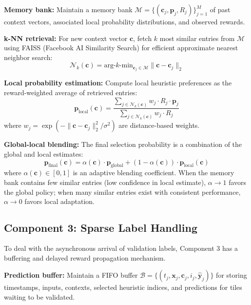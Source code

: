 \documentclass[12pt,oneside]{book}
\begin{document}
\textbf{Memory bank:} Maintain a memory bank $\mathcal{M} = \{(\mathbf{c}_j, \mathbf{p}_j, R_j)\}_{j=1}^{M}$ of past context vectors, associated local probability distributions, and observed rewards.

\textbf{k-NN retrieval:} For new context vector $\mathbf{c}$, fetch $k$ most similar entries from $\mathcal{M}$ using FAISS (Facebook AI Similarity Search) for efficient approximate nearest neighbor search:
\begin{equation}
    \mathcal{N}_k(\mathbf{c}) = \text{arg-}k\text{-min}_{\mathbf{c}_j \in \mathcal{M}} \|\mathbf{c} - \mathbf{c}_j\|_2
\end{equation}

\textbf{Local probability estimation:} Compute local heuristic preferences as the reward-weighted average of retrieved entries:
\begin{equation}
    \mathbf{p}_\text{local}(\mathbf{c}) = \frac{\sum_{j \in \mathcal{N}_k(\mathbf{c})} w_j \cdot R_j \cdot \mathbf{p}_j}{\sum_{j \in \mathcal{N}_k(\mathbf{c})} w_j \cdot R_j}
\end{equation}
where $w_j = \exp(-\|\mathbf{c} - \mathbf{c}_j\|_2^2 / \sigma^2)$ are distance-based weights.

\textbf{Global-local blending:} The final selection probability is a combination of the global and local estimates:
\begin{equation}
    \mathbf{p}_\text{final}(\mathbf{c}) = \alpha(\mathbf{c}) \cdot \mathbf{p}_\text{global} + (1 - \alpha(\mathbf{c})) \cdot \mathbf{p}_\text{local}(\mathbf{c})
\end{equation}
where $\alpha(\mathbf{c}) \in [0, 1]$ is an adaptive blending coefficient. When the memory bank contains few similar entries (low confidence in local estimate), $\alpha \rightarrow 1$ favors the global policy; when many similar entries exist with consistent performance, $\alpha \rightarrow 0$ favors local adaptation.

\subsection{Component 3: Sparse Label Handling}
\label{subsec:component3}

To deal with the asynchronous arrival of validation labels, Component 3 has a buffering and delayed reward propagation mechanism.

\textbf{Prediction buffer:} Maintain a FIFO buffer $\mathcal{B} = \{(t_j, \mathbf{x}_j, \mathbf{c}_j, i_j, \hat{\mathbf{y}}_j)\}$ for storing timestamps, inputs, contexts, selected heuristic indices, and predictions for tiles waiting to be validated.
\end{document}
